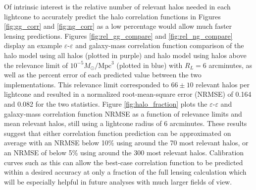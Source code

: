 \documentclass[%
 reprint,
 amsmath,amssymb,
 aps,nofootinbib
]{revtex4-1}
\begin{document}
Of intrinsic interest is the relative number of relevant halos needed in each lightcone to accurately predict the halo correlation functions in Figures \ref{fig:gg_corr} and \ref{fig:ng_corr} as a low percentage would allow much faster lensing predictions. Figures \ref{fig:rel_gg_compare} and \ref{fig:rel_ng_compare} display an example $\varepsilon$-$\varepsilon$ and galaxy-mass correlation function comparison of the halo model using all halos (plotted in purple) and halo model using halos above the relevance limit of ${10^{-5} M_{\odot}/\text{Mpc}^3}$ (plotted in blue) with $R_L=6$ arcminutes, as well as the percent error of each predicted value between the two implementations. This relevance limit corresponded to $66\pm10$ relevant halos per lightcone and resulted in a normalized root-mean-square error (NRMSE) of 0.164 and 0.082 for the two statistics. Figure \ref{fig:halo_fraction} plots the $\varepsilon$-$\varepsilon$ and galaxy-mass correlation function NRMSE as a function of relevance limits and mean relevant halos, still using a lightcone radius of 6 arcminutes. These results suggest that either correlation function prediction can be approximated on average with an NRMSE below 10\% using around the 70 most relevant halos, or an NRMSE of below 5\% using around the 300 most relevant halos. Calibration curves such as this can allow the best-case correlation function to be predicted within a desired accuracy at only a fraction of the full lensing calculation which will be especially helpful in future analyses with much larger fields of view.
\end{document}
